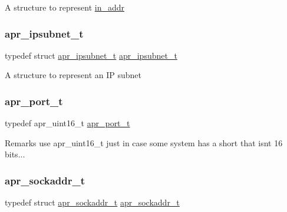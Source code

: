 A structure to represent \mbox{\hyperlink{structin__addr}{in\+\_\+addr}} \mbox{\label{group__apr__network__io_gac86ee04eb80f938902095d1d0a67c324}} 
\subsubsection{\texorpdfstring{apr\+\_\+ipsubnet\+\_\+t}{apr\_ipsubnet\_t}}
{\footnotesize\ttfamily typedef struct \mbox{\hyperlink{group__apr__network__io_gac86ee04eb80f938902095d1d0a67c324}{apr\+\_\+ipsubnet\+\_\+t}} \mbox{\hyperlink{group__apr__network__io_gac86ee04eb80f938902095d1d0a67c324}{apr\+\_\+ipsubnet\+\_\+t}}}

A structure to represent an IP subnet \mbox{\label{group__apr__network__io_gaa670a71960f6eb4fe0d0de2a1e7aba03}} 
\subsubsection{\texorpdfstring{apr\+\_\+port\+\_\+t}{apr\_port\_t}}
{\footnotesize\ttfamily typedef apr\+\_\+uint16\+\_\+t \mbox{\hyperlink{group__apr__network__io_gaa670a71960f6eb4fe0d0de2a1e7aba03}{apr\+\_\+port\+\_\+t}}}

\begin{DoxyRemark}{Remarks}
use apr\+\_\+uint16\+\_\+t just in case some system has a short that isn\textquotesingle{}t 16 bits... 
\end{DoxyRemark}
\mbox{\label{group__apr__network__io_ga373fb6f32d0875c5deb648b779c8a709}} 
\subsubsection{\texorpdfstring{apr\+\_\+sockaddr\+\_\+t}{apr\_sockaddr\_t}}
{\footnotesize\ttfamily typedef struct \mbox{\hyperlink{structapr__sockaddr__t}{apr\+\_\+sockaddr\+\_\+t}} \mbox{\hyperlink{structapr__sockaddr__t}{apr\+\_\+sockaddr\+\_\+t}}}

